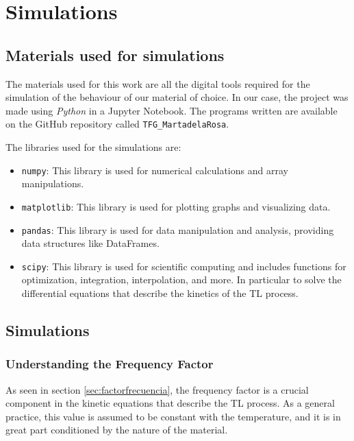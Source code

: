 \chapter{Simulations} \label{ch:4}

\section{Materials used for simulations} \label{sec:materials}

The materials used for this work are all the digital tools required for the simulation of the behaviour of our material of choice. In our case, the project was made using \textit{Python} in a Jupyter Notebook. The programs written are available on the GitHub repository called \texttt{TFG\_MartadelaRosa}. 

\vspace{10pt}

The libraries used for the simulations are:
\begin{itemize}
    \item \texttt{numpy}: This library is used for numerical calculations and array manipulations.
    \item \texttt{matplotlib}: This library is used for plotting graphs and visualizing data.
    \item \texttt{pandas}: This library is used for data manipulation and analysis, providing data structures like DataFrames.
    \item \texttt{scipy}: This library is used for scientific computing and includes functions for optimization, integration, interpolation, and more. In particular to solve the differential equations that describe the kinetics of the TL process.
\end{itemize}



\section{Simulations} \label{sec:simulations}


\subsection{Understanding the Frequency Factor} \label{sec:freq_factor}

As seen in section \ref{sec:factorfrecuencia}, the frequency factor is a crucial component in the kinetic equations that describe the TL process. As a general practice, this value is assumed to be constant with the temperature, and it is in great part conditioned by the nature of the material. 

